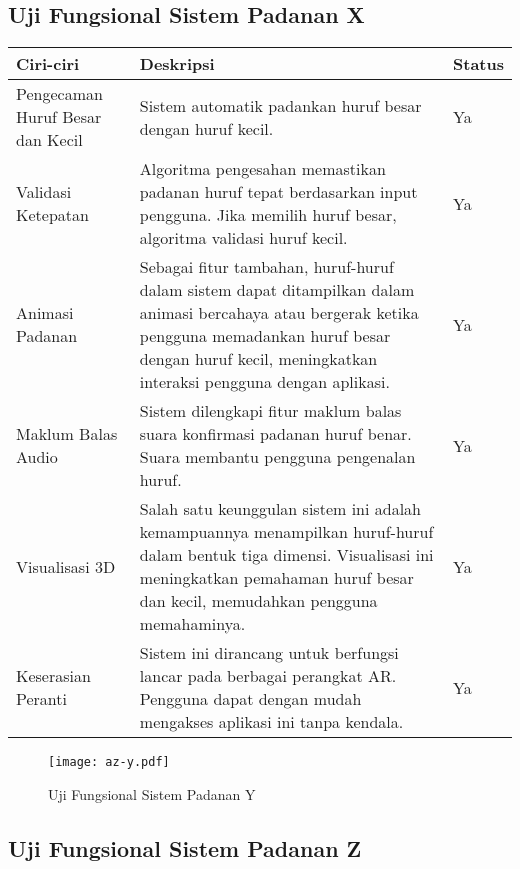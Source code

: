 \begin{itemize}
\begin{itemize}
\begin{itemize}
\begin{itemize}
\begin{itemize}
\begin{itemize}
\begin{itemize}
\begin{itemize}
\begin{flushleft}
\begin{figure}
    
\end{figure}
\subsection{Uji Fungsional  Sistem Padanan X}

\begin{tabular}{>{\raggedright}p{3cm}p{9cm}>{\centering\arraybackslash}p{2cm}}
\toprule
\textbf{Ciri-ciri} & \textbf{Deskripsi} & \textbf{Status} \\
\midrule
Pengecaman Huruf Besar dan Kecil & Sistem automatik padankan huruf besar dengan huruf kecil. & Ya \\

Validasi Ketepatan & Algoritma pengesahan memastikan padanan huruf tepat berdasarkan input pengguna. Jika memilih huruf besar, algoritma validasi huruf kecil. & Ya \\

Animasi Padanan & Sebagai fitur tambahan, huruf-huruf dalam sistem dapat ditampilkan dalam animasi bercahaya atau bergerak ketika pengguna memadankan huruf besar dengan huruf kecil, meningkatkan interaksi pengguna dengan aplikasi. & Ya \\

Maklum Balas Audio & Sistem dilengkapi fitur maklum balas suara konfirmasi padanan huruf benar. Suara membantu pengguna pengenalan huruf. & Ya \\

Visualisasi 3D & Salah satu keunggulan sistem ini adalah kemampuannya menampilkan huruf-huruf dalam bentuk tiga dimensi. Visualisasi ini meningkatkan pemahaman huruf besar dan kecil, memudahkan pengguna memahaminya. & Ya \\

Keserasian Peranti & Sistem ini dirancang untuk berfungsi lancar pada berbagai perangkat AR. Pengguna dapat dengan mudah mengakses aplikasi ini tanpa kendala. & Ya \\
\bottomrule
\end{tabular}

\begin{figure}
    \centering
    \texttt{[image: az-y.pdf]}
    \caption{Uji Fungsional  Sistem Padanan Y}
    \label{fig:az-s.pdf}
  
\end{figure}


\subsection{Uji Fungsional  Sistem Padanan Z}


\end{flushleft}
\end{itemize}
\end{itemize}
\end{itemize}
\end{itemize}
\end{itemize}
\end{itemize}
\end{itemize}
\end{itemize}
